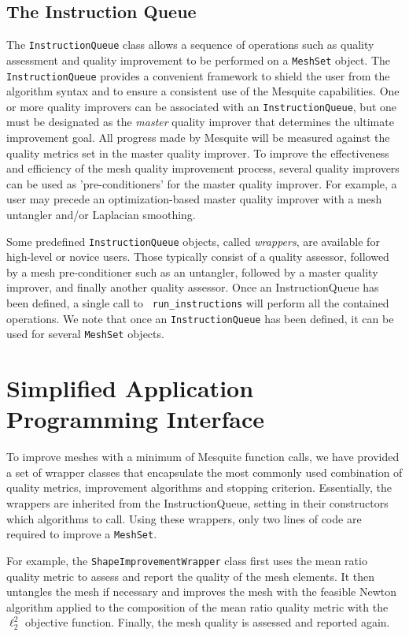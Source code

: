 \documentclass[letter]{report}
\begin{document}
\subsection{The Instruction Queue} \label{sec:IQ}

The \texttt{InstructionQueue} class allows a sequence of operations
such as quality assessment and quality improvement to be performed on
a \texttt{MeshSet} object. The {\tt
InstructionQueue} provides a convenient framework to shield the user
from the algorithm syntax and to ensure a consistent use of the
Mesquite capabilities.  One or more quality improvers can be
associated with an {\tt InstructionQueue}, but one must be designated
as the {\it master} quality improver that determines the ultimate 
improvement goal.  All progress made by Mesquite will be
measured against the quality metrics set in the master quality
improver.  To improve the effectiveness and efficiency of the mesh
quality improvement process, several quality improvers can be used as
'pre-conditioners' for the master quality improver.  For example, a
user may precede an optimization-based master quality improver with a
mesh untangler and/or Laplacian smoothing.

Some predefined {\tt InstructionQueue} objects, called \emph
{wrappers}, are available for high-level or novice users. Those
typically consist of a quality assessor, followed by a mesh
pre-conditioner such as an untangler, followed by a master quality
improver, and finally another quality assessor.  Once an
InstructionQueue has been defined, a single call to {\tt
run\_instructions} will perform all the contained operations.  We note
that once an {\tt InstructionQueue} has been defined, it can be used
for several \texttt{MeshSet} objects.


\section{Simplified Application Programming Interface}
\label{sec:wrappers}
To improve meshes with a minimum of Mesquite function calls, we have 
provided a set of wrapper classes that encapsulate the 
most commonly used combination of quality metrics, improvement
algorithms and stopping criterion. Essentially, the wrappers are
inherited from the InstructionQueue, setting in their constructors
which algorithms to call. Using these wrappers, only
two lines of code are required to improve a \texttt{MeshSet}.

For example, the \texttt{ShapeImprovementWrapper} class 
first uses the mean ratio quality
metric to assess and report the quality of the mesh elements. It then
untangles the mesh if necessary and improves the mesh with the
feasible Newton algorithm applied to the composition of the mean ratio
quality metric with the $\ell_2^2$ objective function. Finally, the
mesh quality is assessed and reported again. 
\end{document}
